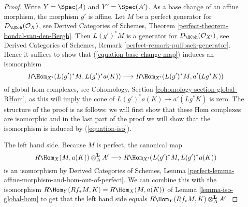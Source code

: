 \begin{proof}
Write $Y = \Spec(A)$ and $Y' = \Spec(A')$. As a base change of an affine
morphism, the morphism $g'$ is affine. Let $M$ be a perfect generator
for $D_\QCoh(\mathcal{O}_X)$, see Derived Categories of Schemes, Theorem
\ref{perfect-theorem-bondal-van-den-Bergh}. Then $L(g')^*M$ is a
generator for $D_\QCoh(\mathcal{O}_{X'})$, see
Derived Categories of Schemes, Remark \ref{perfect-remark-pullback-generator}.
Hence it suffices to show that (\ref{equation-base-change-map})
induces an isomorphism
\begin{equation}
\label{equation-iso}
R\Hom_{X'}(L(g')^*M, L(g')^*a(K))
\longrightarrow
R\Hom_{X'}(L(g')^*M, a'(Lg^*K))
\end{equation}
of global hom complexes, see
Cohomology, Section \ref{cohomology-section-global-RHom},
as this will imply the cone of $L(g')^*a(K) \to a'(Lg^*K)$
is zero.
The structure of the proof is as follows: we will first show that
these Hom complexes are isomorphic and in the last part of the proof
we will show that the isomorphism is induced by (\ref{equation-iso}).

\medskip\noindent
The left hand side. Because $M$ is perfect, the canonical map
$$
R\Hom_X(M, a(K)) \otimes^\mathbf{L}_A A'
\longrightarrow
R\Hom_{X'}(L(g')^*M, L(g')^*a(K))
$$
is an isomorphism by Derived Categories of Schemes, Lemma
\ref{perfect-lemma-affine-morphism-and-hom-out-of-perfect}.
We can combine this with the isomorphism
$R\Hom_Y(Rf_*M, K) = R\Hom_X(M, a(K))$
of Lemma \ref{lemma-iso-global-hom}
to get that the left hand side equals
$R\Hom_Y(Rf_*M, K) \otimes^\mathbf{L}_A A'$.


\end{proof}
